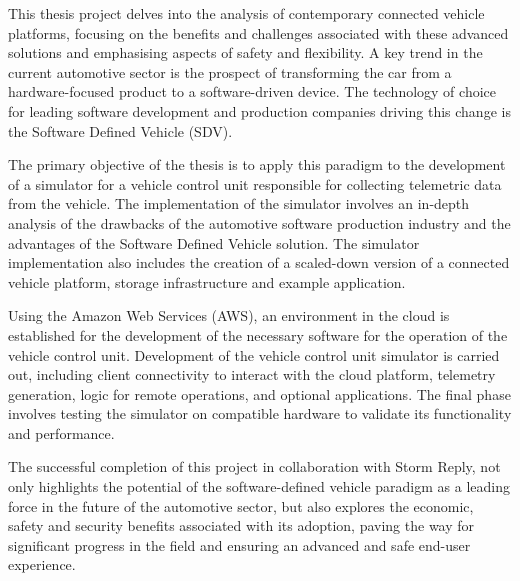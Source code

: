 This thesis project delves into the analysis of contemporary connected vehicle platforms, focusing on the benefits and challenges associated with these advanced solutions and emphasising aspects of safety and flexibility. 
A key trend in the current automotive sector is the prospect of transforming the car from a hardware-focused product to a software-driven device. The technology of choice for leading software development and production companies driving this change is the Software Defined Vehicle (SDV).

The primary objective of the thesis is to apply this paradigm to the development of a simulator for a vehicle control unit responsible for collecting telemetric data from the vehicle.
The implementation of the simulator involves an in-depth analysis of the drawbacks of the automotive software production industry and the advantages of the Software Defined Vehicle solution. The simulator implementation also includes the creation of a scaled-down version of a connected vehicle platform, storage infrastructure and example application.

Using the Amazon Web Services (AWS), an environment in the cloud is established for the development of the necessary software for the operation of the vehicle control unit.
Development of the vehicle control unit simulator is carried out, including client connectivity to interact with the cloud platform, telemetry generation, logic for remote operations, and optional applications. The final phase involves testing the simulator on compatible hardware to validate its functionality and performance.

The successful completion of this project in collaboration with Storm Reply, not only highlights the potential of the software-defined vehicle paradigm as a leading force in the future of the automotive sector, but also explores the economic, safety and security benefits associated with its adoption, paving the way for significant progress in the field and ensuring an advanced and safe end-user experience.
